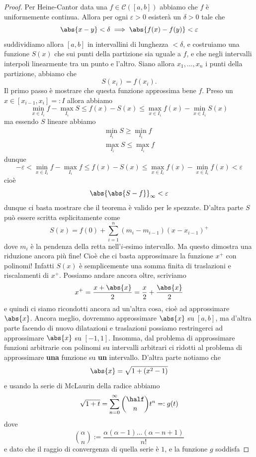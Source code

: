 \documentclass[11pt]{scrartcl}
\begin{document}
	\begin{proof}
		Per Heine-Cantor data una $f\in \mathcal{C}([a,b])$ abbiamo che $f$ è uniformemente continua. Allora per ogni $\varepsilon>0$ esisterà un $\delta>0$ tale che 
		$$\abs{x-y}<\delta \implies \abs{f(x)-f(y)}<\varepsilon$$
		suddividiamo allora $[a,b]$ in intervallini di lunghezza $<\delta$, e costruiamo una funzione $S(x)$ che sui punti della partizione sia uguale a $f$, e che negli intervalli interpoli linearmente tra un punto e l'altro. Siano allora $x_1,\dots,x_n$ i punti della partizione, abbiamo che 
		$$S(x_i)=f(x_i).$$
		Il primo passo è mostrare che questa funzione approssima bene $f$. Preso un $x\in [x_{i-1},x_i]=:I$ allora abbiamo
		$$\min_{x\in I_i} f - \max_{I_i}S\le f(x)-S(x)\le \max_{x\in I_i}f(x)-\min_{x\in I_i}S(x)$$
		ma essendo $S$ lineare abbiamo
		\begin{gather*}
			\min_{I_i} S \ge \min_{I_i} f \\
			\max_{I_i} S \le \max_{I_i} f
		\end{gather*}
		dunque 
		$$-\varepsilon<\min_{x\in I_i} f - \max_{I_i}f\le f(x)-S(x)\le \max_{x\in I_i}f(x)-\min_{x\in I_i}f(x)< \varepsilon$$
		cioè 
		$$\abs{\abs{S-f}}_\infty< \varepsilon$$
		dunque ci basta mostrare che il teorema è valido per le spezzate. D'altra parte $S$ può essere scritta esplicitamente come
		$$S(x)=f(0)+\sum_{i=1}^{n}\left(m_i-m_{i-1}\right)\left(x-x_{i-1}\right)^+$$
		dove $m_i$ è la pendenza della retta nell'$i$-esimo intervallo. Ma questo dimostra una riduzione ancora più fine! Cioè che ci basta approssimare la funzione $x^+$ con polinomi! Infatti $S(x)$ è semplicemente una somma finita di traslazioni e riscalamenti di $x^+$. Possiamo andare ancora oltre, scriviamo
		$$x^+=\frac{x+\abs{x}}{2}=\frac{x}{2}+\frac{\abs{x}}{2}$$
		e quindi ci siamo ricondotti ancora ad un'altra cosa, cioè ad approssimare $\abs{x}$. Ancora meglio, dovremmo approssimare $\abs{x}$ su $[a,b]$, ma d'altra parte facendo di nuovo dilatazioni e traslazioni possiamo restringerci ad approssimare $\abs{x}$ su $[-1,1]$. Insomma, dal problema di approssimare funzioni arbitrarie con polinomi su intervalli arbitrari ci ridotti al problema di approssimare \textbf{una} funzione su \textbf{un} intervallo. D'altra parte notiamo che
		$$\abs{x}=\sqrt{1+\left(x^2-1\right)}$$
		e usando la serie di McLaurin della radice abbiamo
		$$\sqrt{1+t}=\sum_{n=0}^{\infty}\binom{\half}{n}t^n=:g(t)$$
		dove
		$$\binom{\alpha}{n}:=\frac{\alpha\left(\alpha-1\right)\dots \left(\alpha-n+1\right)}{n!}$$
		e dato che il raggio di convergenza di quella serie è $1$, e la funzione $g$ soddisfa

\end{proof}
\end{document}
